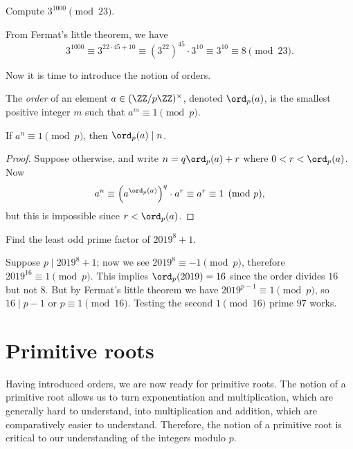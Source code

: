 \documentclass[11pt]{scrartcl}
\begin{document}
\begin{example}
	Compute $3^{1000} \pmod{23}$.
\end{example}

From Fermat's little theorem, we have
\[3^{1000} \equiv 3^{22 \cdot 45 + 10} \equiv (3^{22})^{45} \cdot 3^{10} \equiv 3^{10} \equiv 8 \pmod{23}.\]

Now it is time to introduce the notion of orders.

\begin{definition}
	The \emph{order} of an element $a \in (\ZZ/p\ZZ)^\times$, denoted $\ord_p(a)$, is the smallest positive integer $m$ such that $a^m \equiv 1 \pmod{p}$.
\end{definition}

\begin{theorem}
	If $a^n \equiv 1 \pmod{p}$, then $\ord_p(a) \mid n$.
\end{theorem}

\begin{proof}
	Suppose otherwise, and write $n = q\ord_p(a) + r$ where $0 < r < \ord_p(a)$. Now
	\[a^n \equiv \left(a^{\ord_p(a)}\right)^q \cdot a^r \equiv a^r \equiv 1 \pmod{p},\]
	but this is impossible since $r < \ord_p(a)$.
\end{proof}

\begin{example}[AIME I 2019/14]
	Find the least odd prime factor of $2019^8 + 1$.
\end{example}

Suppose $p \mid 2019^8 + 1$; now we see $2019^8 \equiv -1 \pmod{p}$, therefore $2019^{16} \equiv 1 \pmod{p}$. This implies $\ord_p(2019) = 16$ since the order divides $16$ but not $8$. But by Fermat's little theorem we have $2019^{p - 1} \equiv 1 \pmod{p}$, so $16 \mid p - 1$ or $p \equiv 1 \pmod{16}$. Testing the second $1 \pmod{16}$ prime $97$ works.

\section{Primitive roots}

Having introduced orders, we are now ready for primitive roots. The notion of a primitive root allows us to turn exponentiation and multiplication, which are generally hard to understand, into multiplication and addition, which are comparatively easier to understand. Therefore, the notion of a primitive root is critical to our understanding of the integers modulo $p$.
\end{document}
